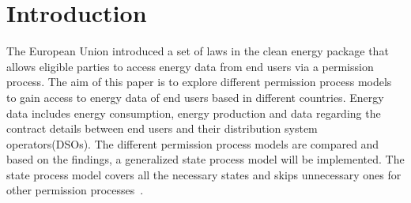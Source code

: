 \section{Introduction}\label{sec:introduction}
The European Union introduced a set of laws in the clean energy package that allows eligible parties to access energy data from end users via a permission process.
The aim of this paper is to explore different permission process models to gain access to energy data of end users based in different countries.
Energy data includes energy consumption, energy production and data regarding the contract details between end users and their distribution system operators(DSOs).
The different permission process models are compared and based on the findings, a generalized state process model will be implemented.
The state process model covers all the necessary states and skips unnecessary ones for other permission processes~\cite{clean-energy}.